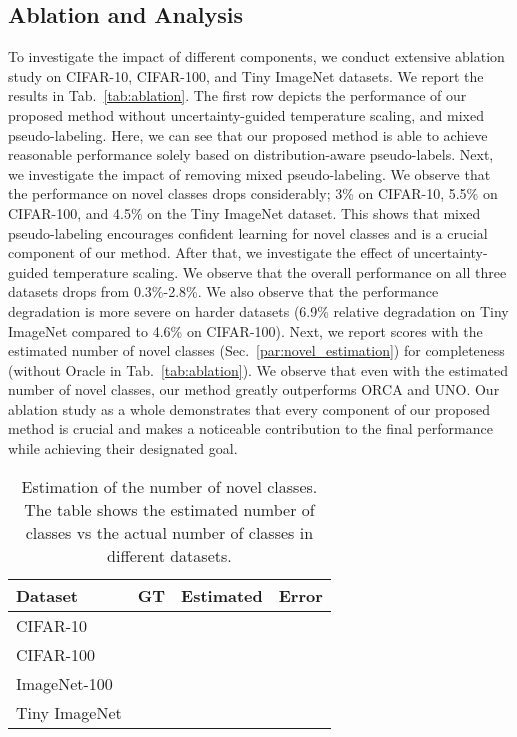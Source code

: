 \documentclass[runningheads]{eccv2022submission}
\begin{document}
\subsection{Ablation and Analysis}
\label{sec:ablation_analysis}
To investigate the impact of different components, we conduct extensive ablation study on CIFAR-10, CIFAR-100, and Tiny ImageNet datasets. We report the results in Tab.~\ref{tab:ablation}. The first row depicts the performance of our proposed method without uncertainty-guided temperature scaling, and mixed pseudo-labeling. Here, we can see that our proposed method is able to achieve reasonable performance solely based on distribution-aware pseudo-labels. Next, we investigate the impact of removing mixed pseudo-labeling. We observe that the performance on novel classes drops considerably; 3\% on CIFAR-10, 5.5\% on CIFAR-100, and 4.5\% on the Tiny ImageNet dataset. This shows that mixed pseudo-labeling encourages confident learning for novel classes and is a crucial component of our method. After that, we investigate the effect of uncertainty-guided temperature scaling. We observe that the overall performance on all three datasets drops from 0.3\%-2.8\%. We also observe that the performance degradation is more severe on harder datasets (6.9\% relative degradation on Tiny ImageNet compared to 4.6\% on CIFAR-100). Next, we report scores with the estimated number of novel classes (Sec.~\ref{par:novel_estimation}) for completeness (without Oracle in Tab.~\ref{tab:ablation}). We observe that even with the estimated number of novel classes, our method greatly outperforms ORCA and UNO. Our ablation study as a whole demonstrates that every component of our proposed method is crucial and makes a noticeable contribution to the final performance while achieving their designated goal.   



\begin{table}
\caption{Estimation of the number of novel classes. The table shows the estimated number of classes vs the actual number of classes in different datasets.}
\begin{center}
\small
\begin{tabular}{l@{\hskip5pt}c@{\hskip5pt}|@{\hskip5pt}c@{\hskip5pt}|@{\hskip5pt}c}
\hline

\textbf{Dataset}  & \textbf{GT} & \textbf{Estimated} & \textbf{Error}\\




\hline
CIFAR-10 &  &  & \\
CIFAR-100 &  &  & \\
ImageNet-100 &  &  & \\
Tiny ImageNet &  &  & \\
\hline 



\end{tabular}
\end{center}
\label{tab:estimation}
\vspace{-6mm}
\end{table}
\end{document}
